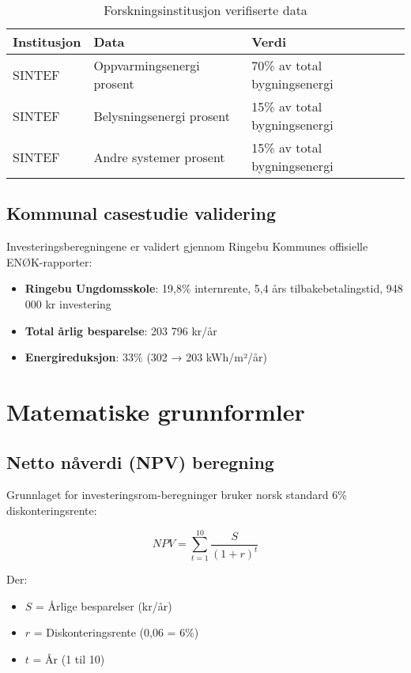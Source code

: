 \documentclass[12pt,a4paper]{article}
\begin{document}
\begin{table}[H]
\centering
\begin{tabular}{|l|l|l|}
\hline
\textbf{Institusjon} & \textbf{Data} & \textbf{Verdi} \\
\hline
SINTEF & Oppvarmingsenergi prosent & 70\% av total bygningsenergi \\
SINTEF & Belysningsenergi prosent & 15\% av total bygningsenergi \\
SINTEF & Andre systemer prosent & 15\% av total bygningsenergi \\
\hline
\end{tabular}
\caption{Forskningsinstitusjon verifiserte data}
\end{table}

\subsection{Kommunal casestudie validering}

Investeringsberegningene er validert gjennom Ringebu Kommunes offisielle ENØK-rapporter:

\begin{itemize}
\item \textbf{Ringebu Ungdomsskole}: 19,8\% internrente, 5,4 års tilbakebetalingstid, 948 000 kr investering
\item \textbf{Total årlig besparelse}: 203 796 kr/år
\item \textbf{Energireduksjon}: 33\% (302 → 203 kWh/m²/år)
\end{itemize}

\section{Matematiske grunnformler}

\subsection{Netto nåverdi (NPV) beregning}

Grunnlaget for investeringsrom-beregninger bruker norsk standard 6\% diskonteringsrente:

\begin{equation}
NPV = \sum_{t=1}^{10} \frac{S}{(1 + r)^t}
\end{equation}

Der:
\begin{itemize}
\item $S$ = Årlige besparelser (kr/år)
\item $r$ = Diskonteringsrente (0,06 = 6\%)
\item $t$ = År (1 til 10)
\end{itemize}
\end{document}
